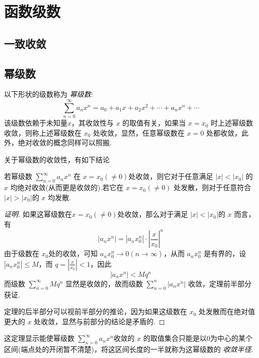 
\section{函数级数}
\label{sec:function-series}

\subsection{一致收敛}
\label{sec:uniform-convergence}



\subsection{幂级数}
\label{sec:power-series}

以下形状的级数称为 \emph{幂级数}:
\[ \sum_{n=0}^{\infty} a_nx^n = a_0+a_1x+a_2x^2+\cdots + a_nx^n+\cdots \]
该级数依赖于未知量$x$，其收敛性与 $x$ 的取值有关，如果当 $x=x_0$ 时上述幂级数收敛，则称上述幂级数在 $x_0$ 处收敛，显然，任意幂级数在 $x=0$ 处都收敛，此外，绝对收敛的概念同样可以照搬.

关于幂级数的收敛性，有如下结论
\begin{theorem}
  若幂级数 $\sum_{n=0}^{\infty}a_nx^n$ 在 $x=x_0(\neq 0)$处收敛，则它对于任意满足 $|x|<|x_0|$ 的 $x$ 均绝对收敛(从而更是收敛的).若它在 $x=x_0(\neq 0)$ 处发散，则对于任意符合 $|x|>|x_0|$的 $x$ 均发散.
\end{theorem}

\begin{proof}[证明]
  如果这幂级数在$x=x_0(\neq 0)$处收敛，那么对于满足 $|x|<|x_0|$的 $x$ 而言，有
  \[ |a_nx^n| = |a_nx_0^n| \cdot \left| \frac{x}{x_0} \right|^n \]
  由于级数在 $x_0$处的收敛，可知 $a_nx_0^n \to 0 (n \to \infty)$，从而 $a_nx_0^n$ 是有界的，设 $|a_nx_0^n| \leqslant M$，而 $q=\left| \frac{x}{x_0} \right| < 1$，因此
  \[ |a_nx^n| < Mq^n \]
  而级数 $\sum_{n=0}^{\infty} Mq^n$ 显然是收敛的，故而级数 $\sum_{n=0}^n|a_nx^n|$ 收敛，定理前半部分获证.

  定理的后半部分可以视前半部分的推论，因为如果这级数在 $x_0$ 处发散而在绝对值更大的 $x$ 处收敛，显然与前部分的结论是矛盾的.
\end{proof}

这定理显示能使幂级数 $\sum_{n=0}^{\infty} a_nx^n$收敛的 $x$ 的取值集合只能是以$0$为中心的某个区间(端点处的开闭暂不清楚)，将这区间长度的一半就称为这幂级数的 \emph{收敛半径}.



